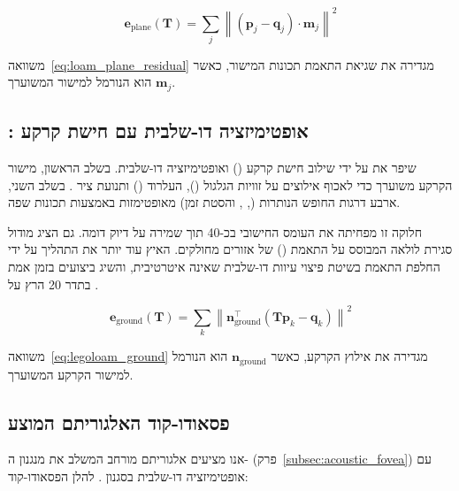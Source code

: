 \begin{equation}
    \mathbf{e}_{\text{plane}}(\mathbf{T}) = \sum_{j} \left\| \left( \mathbf{p}_j - \mathbf{q}_j \right) \cdot \mathbf{m}_j \right\|^2
    \label{eq:loam_plane_residual}
\end{equation}

משוואה~\ref{eq:loam_plane_residual} מגדירה את שגיאת התאמת
תכונות המישור, כאשר $\mathbf{m}_j$ הוא הנורמל למישור המשוערך.

\subsection{: אופטימיזציה דו-שלבית עם חישת קרקע}
\label{subsec:legoloam}

 שיפר את  על ידי שילוב חישת קרקע
() ואופטימיזציה דו-שלבית. בשלב הראשון,
מישור הקרקע משוערך כדי לאכוף אילוצים על זוויות הגלגול
(), העלרוד () ותנועת ציר . בשלב השני,
ארבע דרגות החופש הנותרות (, ,  והסטת זמן)
מאופטימזות באמצעות תכונות שפה.

חלוקה זו מפחיתה את העומס החישובי בכ-40%
תוך שמירה על דיוק דומה.  גם הציג מודול סגירת
לולאה המבוסס על התאמת  ()
של אזורים מחולקים.  האיץ עוד יותר את התהליך על ידי
החלפת התאמת  בשיטת פיצוי עיוות דו-שלבית שאינה איטרטיבית,
והשיג ביצועים בזמן אמת בתדר 20 הרץ על .

\begin{equation}
    \mathbf{e}_{\text{ground}}(\mathbf{T}) = \sum_{k} \left\| \mathbf{n}_{\text{ground}}^\top \left( \mathbf{T} \mathbf{p}_k - \mathbf{q}_k \right) \right\|^2
    \label{eq:legoloam_ground}
\end{equation}

משוואה~\ref{eq:legoloam_ground} מגדירה את אילוץ הקרקע, כאשר
$\mathbf{n}_{\text{ground}}$ הוא הנורמל למישור הקרקע המשוערך.

\subsection{פסאודו-קוד האלגוריתם המוצע}
\label{subsec:algorithm_pseudo}

אנו מציעים אלגוריתם  מורחב המשלב את מנגנון ה-
(פרק~\ref{subsec:acoustic_fovea}) עם אופטימיזציה דו-שלבית בסגנון
. להלן הפסאודו-קוד:

